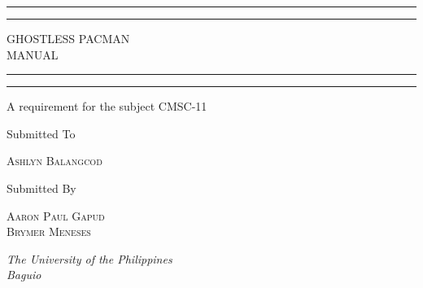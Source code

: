 \begin{titlepage} 

	\centering 
	
	\scshape 
	
	\vspace*{\baselineskip} 
	
	\rule{\textwidth}{1.6pt}\vspace*{-\baselineskip}\vspace*{2pt} 
	\rule{\textwidth}{0.4pt} 
	
	\vspace{0.75\baselineskip} 
	
	{\LARGE GHOSTLESS PACMAN \\ MANUAL} 
	
	\vspace{0.75\baselineskip} 
	
	\rule{\textwidth}{0.4pt}\vspace*{-\baselineskip}\vspace{3.2pt} 
	\rule{\textwidth}{1.6pt} 
	
	\vspace{2\baselineskip} 
	
    A requirement for the subject CMSC-11 
	
	\vspace{3\baselineskip} 
	Submitted To

	\vspace{0.5\baselineskip} 


	{\scshape\Large Ashlyn Balangcod \\} 

	\vspace{3\baselineskip} 
	
	Submitted By
	
	\vspace{0.5\baselineskip} 
	
	{\scshape\Large Aaron Paul Gapud \\ Brymer Meneses \\} 
	
	\vspace{0.5\baselineskip} 
	
	\textit{The University of the Philippines \\ Baguio} 
	
	\vfill 
	
	
	\vspace{0.3\baselineskip} 
	
	

\end{titlepage}
